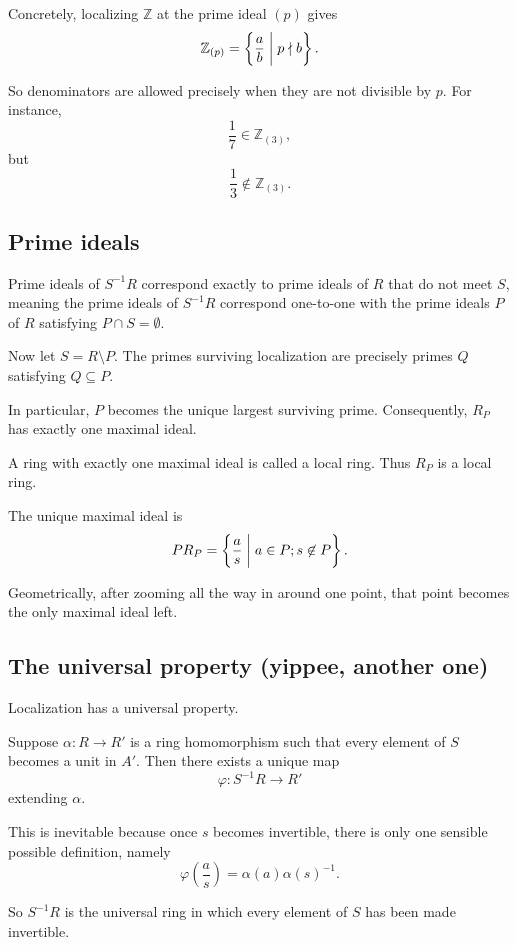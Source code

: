 \documentclass[11pt]{article}
\begin{document}
Concretely, 
localizing $\mathbb Z$ at the prime ideal $(p)$ gives
\[
    \mathbb Z_{(p)} 
    = \left\{\frac{a}{b} \biggm| p \nmid b\right\}. 
\]

So denominators are allowed precisely 
when they are not divisible by $p$. 
For instance, 
\[
    \frac{1}{7} \in \mathbb Z_{(3)}, 
\]
but 
\[
    \frac{1}{3} \not\in \mathbb Z_{(3)}. 
\]

\subsection{Prime ideals} 

Prime ideals of $S^{-1}R$ correspond exactly 
to prime ideals of $R$ that do not meet $S$, meaning 
the prime ideals of $S^{-1}R$ correspond one-to-one 
with the prime ideals $P$ of $R$ satisfying 
$P \cap S = \emptyset$. 

Now let 
$S = R \setminus P$. The primes surviving localization are 
precisely primes $Q$ satisfying $Q \subseteq P$. 

In particular, $P$ becomes the unique largest surviving 
prime. 
Consequently, 
$R_P$ has exactly one maximal ideal. 

A ring with exactly one maximal ideal is called a 
local ring. 
Thus $R_P$ is a local ring. 

The unique maximal ideal is 
\[
    PR_P = \left\{\frac{a}{s} \biggm| a \in P; s \not\in 
    P\right\}. 
\]

Geometrically, after zooming all the way in around 
one point, that point becomes the only maximal ideal left. 

\subsection{The universal property (yippee, another one)}

Localization has a universal property. 

Suppose $\alpha : R \to R'$ is a ring homomorphism 
such that every element of $S$ becomes a unit in $A'$. 
Then there exists a unique map 
\[
    \varphi : S^{-1}R \to R' 
\]
extending $\alpha$. 

This is inevitable because once $s$ becomes invertible, 
there is only one sensible possible definition, namely 
\[
    \varphi\left(\frac{a}{s}\right) = 
    \alpha(a) \alpha(s)^{-1}. 
\]

So $S^{-1}R$ is the universal ring in which every 
element of $S$ has been made invertible. 
\end{document}
